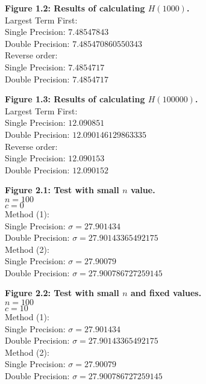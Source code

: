 \documentclass[12pt]{article}
\begin{document}
\begin{figure}[h]
	\textbf{Figure 1.2: Results of calculating $H(1000)$.}\\
	Largest Term First:\\
	Single Precision: $7.48547843$\\
	Double Precision: $7.485470860550343$\\
	
	Reverse order:\\
	Single Precision: $7.4854717$\\
	Double Precision: $7.4854717$
\end{figure}

\begin{figure}[h]
	\textbf{Figure 1.3: Results of calculating $H(100000)$.}\\
	Largest Term First:\\
	Single Precision: $12.090851$\\
	Double Precision: $12.090146129863335$\\
	
	Reverse order:\\
	Single Precision: $12.090153$\\
	Double Precision: $12.090152$	
\end{figure}

\begin{figure}[h]
	\textbf{Figure 2.1: Test with small $n$ value.}\\
	$n=100$\\
	$c=0$\\
	
	Method (1):\\
	Single Precision: $\sigma=27.901434$\\
	Double Precision: $\sigma=27.90143365492175$\\
	
	Method (2):\\
	Single Precision: $\sigma=27.90079$\\
	Double Precision: $\sigma=27.900786727259145$
\end{figure}

\begin{figure}[h]
	\textbf{Figure 2.2: Test with small $n$ and fixed values.}\\
	$n=100$\\
	$c=10$\\
	
	Method (1):\\
	Single Precision: $\sigma=27.901434$\\
	Double Precision: $\sigma=27.90143365492175$\\
	
	Method (2):\\
	Single Precision: $\sigma=27.90079$\\
	Double Precision: $\sigma=27.900786727259145$
\end{figure}
\end{document}
